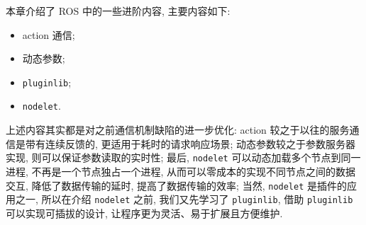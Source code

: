 \documentclass[openany, fontset=windowsold]{ctexbook}
\theoremstyle{kaiti}
\theoremstyle{normal}
\begin{document}
本章介绍了 ROS 中的一些进阶内容, 主要内容如下:

\begin{itemize}
  \item action 通信;
  \item 动态参数;
  \item \verb|pluginlib|;
  \item \verb|nodelet|.
\end{itemize}

上述内容其实都是对之前通信机制缺陷的进一步优化: action 较之于以往的服务通信是带有连续反馈的, 更适用于耗时的请求响应场景; 动态参数较之于参数服务器实现, 则可以保证参数读取的实时性; 最后, \verb|nodelet| 可以动态加载多个节点到同一进程, 不再是一个节点独占一个进程, 从而可以零成本的实现不同节点之间的数据交互, 降低了数据传输的延时, 提高了数据传输的效率; 当然, \verb|nodelet| 是插件的应用之一, 所以在介绍 \verb|nodelet| 之前, 我们又先学习了 \verb|pluginlib|, 借助 \verb|pluginlib| 可以实现可插拔的设计, 让程序更为灵活、易于扩展且方便维护.
\end{document}
